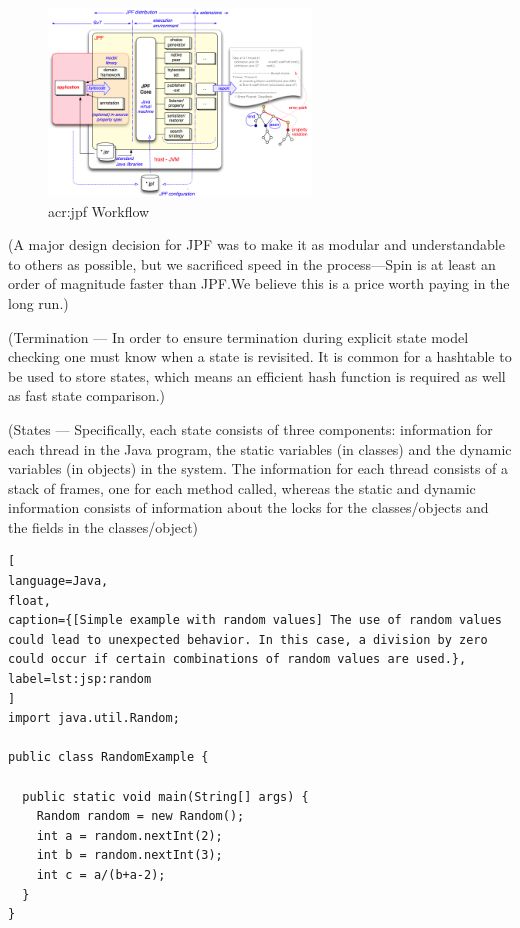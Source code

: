 \begin{figure}[h]
\centering
\includegraphics[height=5cm]{img/jpf-components}
\caption{\acrshort{acr:jpf} Workflow}
\label{fig:jpf:process}
\end{figure}

(A major design decision for JPF was to make it as modular and understandable to others as possible, but we sacrificed speed in the process—Spin is at least an order of magnitude faster than JPF.We believe this is a price worth paying in the long run.)

(Termination --- In order to ensure termination during explicit state model checking one must know when a state is revisited. It is common for a hashtable to be used to store states, which means an efficient hash function is required as well as fast state comparison.)

(States --- Specifically, each state consists of three components: information for each thread in the Java program, the static variables (in classes) and the dynamic variables (in objects) in the system. The information for each thread consists of a stack of frames, one for each method called, whereas the static and dynamic information consists of information about the locks for the classes/objects and the fields in the classes/object)



\begin{lstlisting}[
language=Java,
float,
caption={[Simple example with random values] The use of random values could lead to unexpected behavior. In this case, a division by zero could occur if certain combinations of random values are used.},
label=lst:jsp:random
]
import java.util.Random;

public class RandomExample {

  public static void main(String[] args) {
    Random random = new Random();
    int a = random.nextInt(2);
    int b = random.nextInt(3);
    int c = a/(b+a-2);
  }
}
\end{lstlisting}


